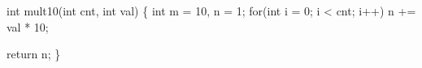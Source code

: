 \begin{minipage}{\hsize/2-0.1in}\raggedright\disableoverfull
\begin{AVerb}[gobble=2,numbers=left]
  int mult10(int cnt, int val) \{ 
    int m = 10, n = 1; 
    for(int i = 0; i < cnt; i++)
      n += val * 10; \label{fig_back7_opt_loop}

    return n;
  \}
\end{AVerb}
\end{minipage}
